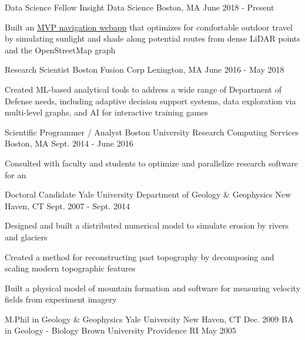 \documentclass[11pt, a4paper]{awesome-cv}
\begin{document}
\begin{cventries}

  \cventrytight
    {Data Science Fellow}
    {Insight Data Science}
    {Boston, MA}
    {June 2018 - Present}
    {
    \begin{cvitems}
      \item Built an \href{https://www.allnans.com/jekyll/update/2018/08/07/introducing-parasol.html}{MVP navigation webapp} that optimizes for comfortable outdoor travel by simulating sunlight and shade along potential routes from dense LiDAR points and the OpenStreetMap graph
    \end{cvitems}
    }

  \cventrytight
    {Research Scientist}
    {Boston Fusion Corp}
    {Lexington, MA}
    {June 2016 - May 2018}
    {
      \begin{cvitems}
        \item Created ML-based analytical tools to address a wide range of Department of Defense needs, including adaptive decision support systems, data exploration via multi-level graphs, and AI for interactive training games
      \end{cvitems}
    }

  \cventrytight
    {Scientific Programmer / Analyst}
    {Boston University Research Computing Services}
    {Boston, MA}
    {Sept. 2014 - June 2016}
    {
      \begin{cvitems}
        \item {Consulted with faculty and students to optimize and parallelize research software for an } 
      \end{cvitems}
    }

  \cventrytight
    {Doctoral Candidate}
    {Yale University Department of Geology \& Geophysics}
    {New Haven, CT}
    {Sept. 2007 - Sept. 2014}
    {
      \begin{cvitems}
        \item {Designed and built a distributed numerical model to simulate erosion by rivers and glaciers}
        \item {Created a method for reconstructing past topography by decomposing and scaling modern topographic features}
        \item {Built a physical model of mountain formation and software for measuring velocity fields from experiment imagery}
      \end{cvitems} 
    }

\end{cventries}


\begin{cventries}
  \cventry
    {M.Phil in Geology \& Geophysics}
    {Yale University}
    {New Haven, CT}
    {Dec. 2009}
    {}
  \cventrytight
    {BA in Geology - Biology}
    {Brown University}
    {Providence RI}
    {May 2005}
    {}
\end{cventries}
\end{document}
